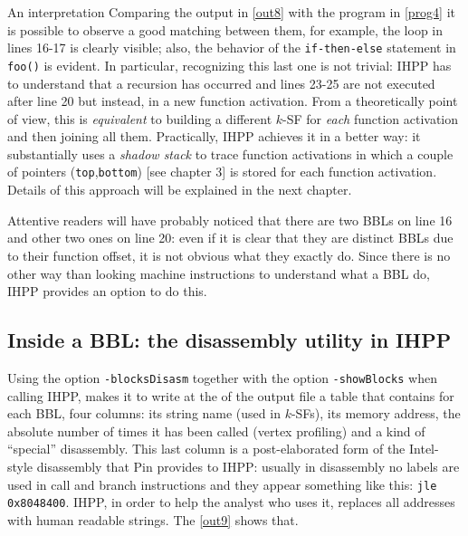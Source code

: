 \documentclass[a4paper,10pt]{report}
\begin{document}
\begin{paragraph}{An interpretation}
Comparing the output in \cref{out8} with the program in \cref{prog4} it is possible to 
observe a good matching between them, for example, the loop in lines 16-17 
is clearly visible; also, the behavior of the \verb|if-then-else| statement in \verb|foo()| is evident. In particular, recognizing this last one is not trivial: 
IHPP has to understand that a recursion has occurred and lines 23-25
are not executed after line 20 but instead, in a new function activation. 
From a theoretically point of view, 
this is \emph{equivalent} to building a different $k$-SF
for \emph{each} function activation and then joining all them. 
Practically, IHPP achieves it in a better way: 
it substantially uses a \emph{shadow stack} to trace function activations in which
a couple of pointers (\verb|top|,\verb|bottom|) [see chapter 3] is stored for each 
function activation. Details of this approach will be explained in the next chapter.
\end{paragraph}

Attentive readers will have probably noticed that there are two BBLs on line 16 
and other two ones on line 20: even if it is clear that they are distinct 
BBLs due to their function offset, it is not obvious what they exactly do.
Since there is no other way than looking machine instructions to understand 
what a BBL do, IHPP provides an option to do this.

\subsection{Inside a BBL: the disassembly utility in IHPP}

Using the option \verb|-blocksDisasm| together with the option \verb|-showBlocks| 
when calling IHPP, makes it to write at the of the output file a table 
that contains for each BBL, four columns: its string name (used in $k$-SFs), its memory address, the absolute number of times it has been called (vertex profiling) and
a kind of ``special'' disassembly. This last column is a post-elaborated form 
of the Intel-style disassembly that Pin provides to IHPP: usually in disassembly 
no labels are used in call and branch instructions and they appear something like this: 
\verb|jle 0x8048400|. IHPP, in order to help the analyst who uses it, replaces 
all addresses with human readable strings. The \cref{out9} shows that.
\end{document}

